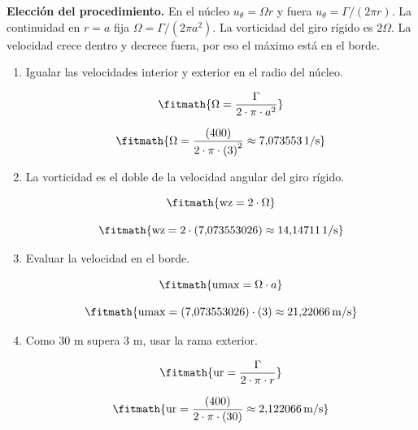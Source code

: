 \noindent\textbf{Elección del procedimiento.} En el núcleo $u_\theta=\Omega r$ y fuera $u_\theta=\Gamma/(2\pi r)$. La continuidad en $r=a$ fija $\Omega=\Gamma/(2\pi a^2)$. La vorticidad del giro rígido es $2\Omega$. La velocidad crece dentro y decrece fuera, por eso el máximo está en el borde.

\begin{enumerate}

\item Igualar las velocidades interior y exterior en el radio del núcleo.

\[\fitmath{\Omega=\frac{\Gamma}{2\cdot \pi\cdot {a}^{2}}}\]

\[\fitmath{\Omega=\frac{(400)}{2\cdot \pi\cdot {(3)}^{2}}\approx 7{,}073553\,\mathrm{1/s}}\]

\item La vorticidad es el doble de la velocidad angular del giro rígido.

\[\fitmath{\mathrm{wz}=2\cdot \Omega}\]

\[\fitmath{\mathrm{wz}=2\cdot (7{,}073553026)\approx 14{,}14711\,\mathrm{1/s}}\]

\item Evaluar la velocidad en el borde.

\[\fitmath{\mathrm{umax}=\Omega\cdot a}\]

\[\fitmath{\mathrm{umax}=(7{,}073553026)\cdot (3)\approx 21{,}22066\,\mathrm{m/s}}\]

\item Como 30 m supera 3 m, usar la rama exterior.

\[\fitmath{\mathrm{ur}=\frac{\Gamma}{2\cdot \pi\cdot r}}\]

\[\fitmath{\mathrm{ur}=\frac{(400)}{2\cdot \pi\cdot (30)}\approx 2{,}122066\,\mathrm{m/s}}\]

\end{enumerate}
